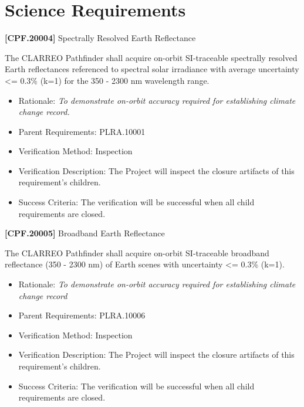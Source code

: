 \section{Science Requirements}
\label{sciencerequirements}

\textbf{[CPF.20004]} Spectrally Resolved Earth Reflectance

The \gls{CLARREO} Pathfinder shall acquire on-orbit \gls{SI}-traceable spectrally resolved Earth reflectances referenced to spectral solar irradiance with average uncertainty <= 0.3\% (k=1) for the 350 - 2300 nm wavelength range.

\begin{itemize}
\item{} Rationale: \emph{To demonstrate on-orbit accuracy required for establishing climate change record.}

\item{} Parent Requirements: PLRA.10001

\item{} Verification Method: Inspection

\item{} Verification Description: The Project will inspect the closure artifacts of this requirement's children.

\item{} Success Criteria: The verification will be successful when all child requirements are closed.

\end{itemize}

\textbf{[CPF.20005]} Broadband Earth Reflectance

The \gls{CLARREO} Pathfinder shall acquire on-orbit \gls{SI}-traceable broadband reflectance (350 - 2300 nm) of Earth scenes with uncertainty <= 0.3\% (k=1).

\begin{itemize}
\item{} Rationale: \emph{To demonstrate on-orbit accuracy required for establishing climate change record}

\item{} Parent Requirements: PLRA.10006

\item{} Verification Method: Inspection

\item{} Verification Description: The Project will inspect the closure artifacts of this requirement's children.

\item{} Success Criteria: The verification will be successful when all child requirements are closed.

\end{itemize}

